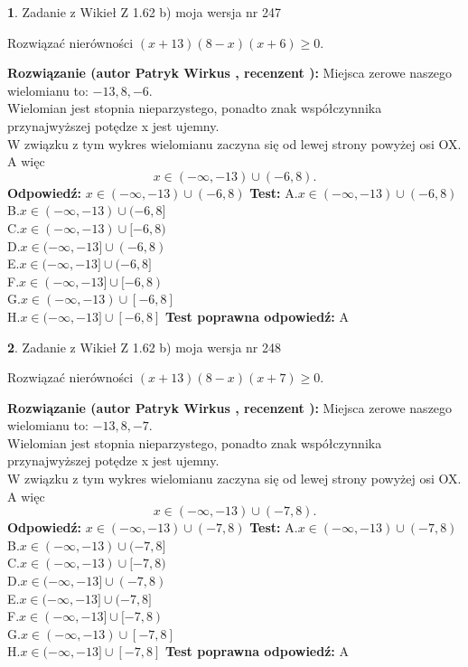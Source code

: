 \documentclass[12pt, a4paper]{article}
\theoremstyle{definition} %
\newtheorem{zad}{}
\newcommand{\zadStart}[1]{\begin{zad}#1\newline}
\newcommand{\zadStop}{\end{zad}}
\newcommand{\rozwStart}[2]{\noindent \textbf{Rozwiązanie (autor #1 , recenzent #2): }\newline}
\newcommand{\rozwStop}{\newline}
\newcommand{\odpStart}{\noindent \textbf{Odpowiedź:}\newline}
\newcommand{\odpStop}{\newline}
\newcommand{\testStart}{\noindent \textbf{Test:}\newline}
\newcommand{\testStop}{\newline}
\newcommand{\kluczStart}{\noindent \textbf{Test poprawna odpowiedź:}\newline}
\newcommand{\kluczStop}{\newline}
\begin{document}
\zadStart{Zadanie z Wikieł Z 1.62 b) moja wersja nr 247}

Rozwiązać nierówności $(x+13)(8-x)(x+6)\ge0$.
\zadStop
\rozwStart{Patryk Wirkus}{}
Miejsca zerowe naszego wielomianu to: $-13, 8, -6$.\\
Wielomian jest stopnia nieparzystego, ponadto znak współczynnika przy\linebreak najwyższej potędze x jest ujemny.\\ W związku z tym wykres wielomianu zaczyna się od lewej strony powyżej osi OX. A więc $$x \in (-\infty,-13) \cup (-6,8).$$
\rozwStop
\odpStart
$x \in (-\infty,-13) \cup (-6,8)$
\odpStop
\testStart
A.$x \in (-\infty,-13) \cup (-6,8)$\\
B.$x \in (-\infty,-13) \cup (-6,8]$\\
C.$x \in (-\infty,-13) \cup [-6,8)$\\
D.$x \in (-\infty,-13] \cup (-6,8)$\\
E.$x \in (-\infty,-13] \cup (-6,8]$\\
F.$x \in (-\infty,-13] \cup [-6,8)$\\
G.$x \in (-\infty,-13) \cup [-6,8]$\\
H.$x \in (-\infty,-13] \cup [-6,8]$
\testStop
\kluczStart
A
\kluczStop



\zadStart{Zadanie z Wikieł Z 1.62 b) moja wersja nr 248}

Rozwiązać nierówności $(x+13)(8-x)(x+7)\ge0$.
\zadStop
\rozwStart{Patryk Wirkus}{}
Miejsca zerowe naszego wielomianu to: $-13, 8, -7$.\\
Wielomian jest stopnia nieparzystego, ponadto znak współczynnika przy\linebreak najwyższej potędze x jest ujemny.\\ W związku z tym wykres wielomianu zaczyna się od lewej strony powyżej osi OX. A więc $$x \in (-\infty,-13) \cup (-7,8).$$
\rozwStop
\odpStart
$x \in (-\infty,-13) \cup (-7,8)$
\odpStop
\testStart
A.$x \in (-\infty,-13) \cup (-7,8)$\\
B.$x \in (-\infty,-13) \cup (-7,8]$\\
C.$x \in (-\infty,-13) \cup [-7,8)$\\
D.$x \in (-\infty,-13] \cup (-7,8)$\\
E.$x \in (-\infty,-13] \cup (-7,8]$\\
F.$x \in (-\infty,-13] \cup [-7,8)$\\
G.$x \in (-\infty,-13) \cup [-7,8]$\\
H.$x \in (-\infty,-13] \cup [-7,8]$
\testStop
\kluczStart
A
\kluczStop
\end{document}
